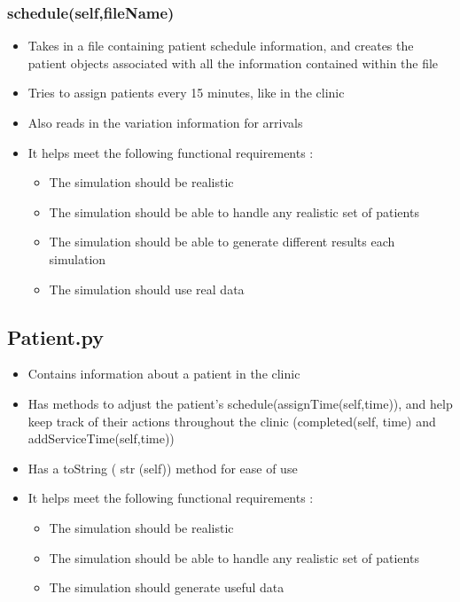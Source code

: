 \documentclass[12pt]{article}
\begin{document}
\subsubsection{schedule(self,fileName)}
\begin{itemize}
	\item Takes in a file containing patient schedule information, and creates the patient objects associated with all the information contained within the file
	\item Tries to assign patients every 15 minutes, like in the clinic
	\item Also reads in the variation information for arrivals
	\item It helps meet the following functional requirements :
	\begin{itemize}
		\item The simulation should be realistic
		\item The simulation should be able to handle any realistic set of patients
		\item The simulation should be able to generate different results each simulation
		\item The simulation should use real data
	\end{itemize}
\end{itemize}

\subsection{Patient.py}
\begin{itemize}  
\item Contains information about a patient in the clinic
\item Has methods to adjust the patient's schedule(assignTime(self,time)), and help keep track of their actions throughout the clinic (completed(self, time) and addServiceTime(self,time))
\item Has a toString ( str (self)) method for ease of use
\item It helps meet the following functional requirements :
\begin{itemize}
	\item The simulation should be realistic
	\item The simulation should be able to handle any realistic set of patients
	\item The simulation should generate useful data 
\end{itemize}
\end{itemize}
\end{document}
